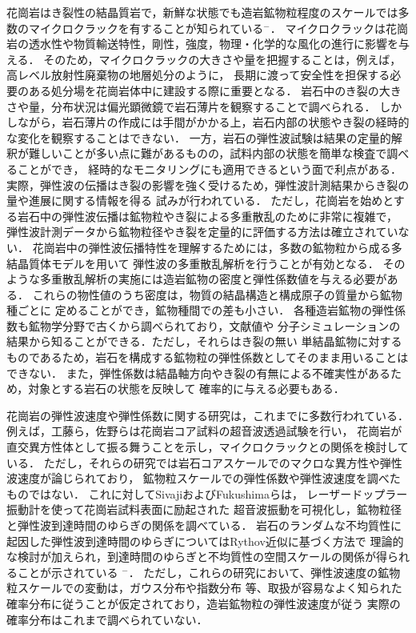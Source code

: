花崗岩はき裂性の結晶質岩で，新鮮な状態でも造岩鉱物粒程度のスケールでは多数のマイクロクラックを有することが知られている\cite{Kudo1}$^-$\cite{Takagi}．
マイクロクラックは花崗岩の透水性や物質輸送特性，剛性，強度，物理・化学的な風化の進行に影響を与える．
そのため，マイクロクラックの大きさや量を把握することは，例えば，高レベル放射性廃棄物の地層処分のように，
長期に渡って安全性を担保する必要のある処分場を花崗岩体中に建設する際に重要となる．
%
岩石中のき裂の大きさや量，分布状況は偏光顕微鏡で岩石薄片を観察することで調べられる．
しかしながら，岩石薄片の作成には手間がかかる上，岩石内部の状態やき裂の経時的な変化を観察することはできない．
一方，岩石の弾性波試験は結果の定量的解釈が難しいことが多い点に難があるものの，試料内部の状態を簡単な検査で調べることができ，
経時的なモニタリングにも適用できるという面で利点がある．
実際，弾性波の伝播はき裂の影響を強く受けるため，弾性波計測結果からき裂の量や進展に関する情報を得る
試みが行われている\cite{Griffiths}．
ただし，花崗岩を始めとする岩石中の弾性波伝播は鉱物粒やき裂による多重散乱のために非常に複雑で\cite{Sato}，
弾性波計測データから鉱物粒径やき裂を定量的に評価する方法は確立されていない．
%
花崗岩中の弾性波伝播特性を理解するためには，多数の鉱物粒から成る多結晶質体モデルを用いて
弾性波の多重散乱解析を行うことが有効となる\cite{FEM}．
そのような多重散乱解析の実施には造岩鉱物の密度と弾性係数値を与える必要がある．
これらの物性値のうち密度は，物質の結晶構造と構成原子の質量から鉱物種ごとに
定めることができ，鉱物種間での差も小さい．
各種造岩鉱物の弾性係数も鉱物学分野で古くから調べられており，文献値\cite{AGU}や
分子シミュレーション\cite{Kawamura}の結果から知ることができる．ただし，それらはき裂の無い
単結晶鉱物に対するものであるため，岩石を構成する鉱物粒の弾性係数としてそのまま用いることはできない．
また，弾性係数は結晶軸方向やき裂の有無による不確実性があるため，対象とする岩石の状態を反映して
確率的に与える必要もある．

花崗岩の弾性波速度や弾性係数に関する研究は，これまでに多数行われている．
例えば，工藤ら\cite{Kudo2}，佐野ら\cite{Sano1}は花崗岩コア試料の超音波透過試験を行い，
花崗岩が直交異方性体として振る舞うことを示し，マイクロクラックとの関係を検討している．
ただし，それらの研究では岩石コアスケールでのマクロな異方性や弾性波速度が論じられており，
鉱物粒スケールでの弾性係数や弾性波速度を調べたものではない．
これに対してSivaji\cite{Sivaji}およびFukushima\cite{Fukushima}らは，
レーザードップラー振動計を使って花崗岩試料表面に励起された
超音波振動を可視化し，鉱物粒径と弾性波到達時間のゆらぎの関係を調べている．
岩石のランダムな不均質性に起因した弾性波到達時間のゆらぎについてはRythov近似に基づく方法で
理論的な検討が加えられ，到達時間のゆらぎと不均質性の空間スケールの関係が得られることが示されている
\cite{Muller}$^-$\cite{Baig}．
ただし，これらの研究において、弾性波速度の鉱物粒スケールでの変動は，ガウス分布や指数分布
等、取扱が容易なよく知られた確率分布に従うことが仮定されており，造岩鉱物粒の弾性波速度が従う
実際の確率分布はこれまで調べられていない．

